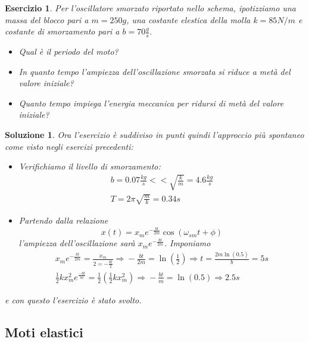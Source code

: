 \documentclass{article}
\newtheorem{es}{Esercizio}[section]
\newtheorem{sol}{Soluzione}[section]
\begin{document}
\begin{es}
  Per l'oscillatore smorzato riportato nello schema, ipotizziamo una massa del blocco pari a $m=250g$, una costante elestica della molla $k=85 N/m$ e costante di smorzamento pari a $b=70\frac{g}{s}$.
  \begin{itemize}
  \item Qual è il periodo del moto?
  \item In quanto tempo l'ampiezza dell'oscillazione smorzata si riduce a metà del valore iniziale?
  \item Quanto tempo impiega l'energia meccanica per ridursi di metà del valore iniziale?
  \end{itemize}
\end{es}
\begin{sol}
  Ora l'esercizio è suddiviso in punti quindi l'approccio più spontaneo come visto negli esercizi precedenti:
  \begin{itemize}
  \item Verifichiamo il livello di smorzamento:
    \begin{equation*}
      \begin{matrix}
        b= 0.07\frac{kg}{s} << \sqrt{\frac{k}{m}}=4.6\frac{kg}{s}\\
        T=2\pi \sqrt{\frac{m}{k}}=0.34s
      \end{matrix}
    \end{equation*}
  \item Partendo dalla relazione
    \begin{equation*}
      x(t)=x_me^{-\frac{bt}{2m}}\cos\left(\omega_{sm}t+\phi\right)
    \end{equation*}
    l'ampiezza dell'oscillazione sarà $x_me^{-\frac{bt}{2m}}$. Imponiamo
    \begin{equation*}
      \begin{matrix}
        x_me^{-\frac{bt}{2m}}=\frac{x_m}{2=-\frac{bt}{2}}\Rightarrow{}-\frac{bt}{2m}=\ln\left(\frac{1}{2}\right)\Rightarrow{} t=\frac{2m\ln(0.5)}{b}=5s\\
        \frac{1}{2}kx_m^2e^{\frac{-bt}{m}}=\frac{1}{2}\left(\frac{1}{2}kx_m^2\right)\Rightarrow{}-\frac{bt}{m}=\ln(0.5)\Rightarrow{}2.5s
      \end{matrix}
    \end{equation*}
  \end{itemize}
  e con questo l'esercizio è stato svolto.
\end{sol}

\subsection{Moti elastici}
\label{sec:motielastici}
\end{document}

